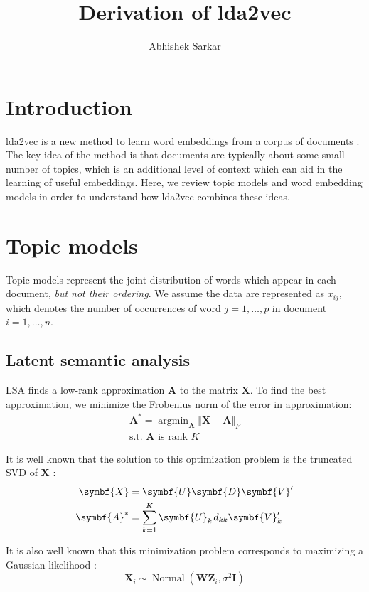 \documentclass{amsart}
\title{Derivation of lda2vec}
\author{Abhishek Sarkar}
\DeclareMathOperator\argmin{\arg\min}
\DeclareMathOperator\N{Normal}
\newcommand\ma{\symbf{A}}
\newcommand\mx{\symbf{X}}
\newcommand\mU{\symbf{U}}
\newcommand\md{\symbf{D}}
\newcommand\mv{\symbf{V}}
\newcommand\mw{\symbf{W}}
\newcommand\mz{\symbf{Z}}
\begin{document}
\maketitle

\section{Introduction}

lda2vec is a new method to learn word embeddings from a corpus of documents
\cite{Moody2016}. The key idea of the method is that documents are typically
about some small number of topics, which is an additional level of context
which can aid in the learning of useful embeddings. Here, we review topic
models and word embedding models in order to understand how lda2vec combines
these ideas.

\section{Topic models}

Topic models represent the joint distribution of words which appear in each
document, \emph{but not their ordering}. We assume the data are represented as
\(x_{ij}\), which denotes the number of occurrences of word \(j = 1, \ldots,
p\) in document \(i = 1, \ldots, n\).

\subsection{Latent semantic analysis}

LSA finds a low-rank approximation \(\ma\) to the matrix \(\mx\). To find the
best approximation, we minimize the Frobenius norm of the error in
approximation:
%
\begin{equation}
  \begin{split}
    \ma^* = \argmin_{\ma} \Vert \mx - \ma \Vert_F \\
    \text{s.t. \(\ma\) is rank \(K\)}
  \end{split}
\end{equation}

It is well known that the solution to this optimization problem is the
truncated SVD of \(\mx\) \cite{Eckart1936}:
%
\begin{align}
  \mx &= \mU\md\mv'\\
  \ma^* &= \sum_{k=1}^K \mU_k\mkern+2mu d_{kk} \mv_k'
\end{align}

It is also well known that this minimization problem corresponds to maximizing
a Gaussian likelihood \cite{Tipping1999}:
%
\begin{equation}
  \mx_i \sim \N(\mw\mz_i, \sigma^2 \symbf{I})
\end{equation}
\end{document}
